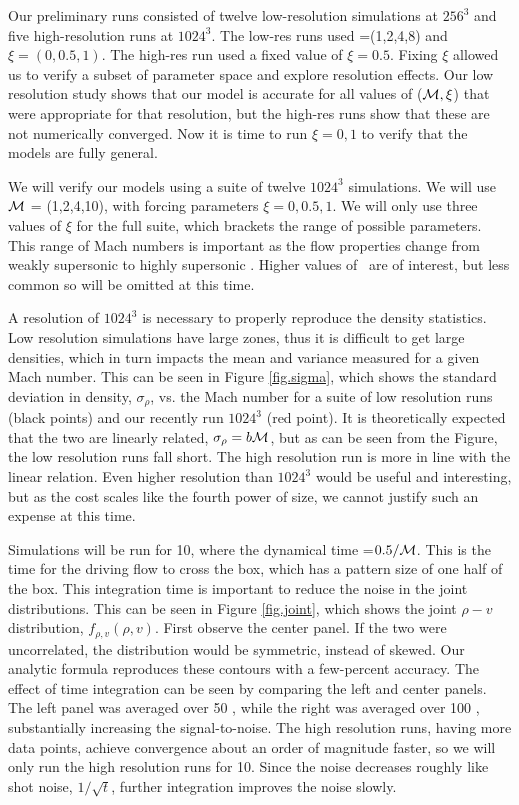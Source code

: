 Our preliminary runs consisted of twelve low-resolution simulations at $256^3$
and five high-resolution runs at $1024^3$.  The low-res runs used
\mach=(1,2,4,8) and $\xi=(0,0.5,1)$.  The high-res run used a fixed value of
$\xi=0.5$.  Fixing $\xi$ allowed us to verify a subset of parameter space and
explore resolution effects.      Our low resolution study shows that our model is
accurate for all values of ($\mathcal{M},\xi$) that were appropriate for that
resolution, but the high-res runs show that these are not numerically converged.
Now it is time to run $\xi=0,1$ to verify that the models are fully
general. 

We will verify our models using a suite of twelve $1024^3$ simulations.  We will use
$\mathcal{M}$ = (1,2,4,10), with forcing parameters $\xi=0,0.5,1$.   We will
only use three values of $\xi$ for the full suite, which brackets the range of
possible parameters.  This range of Mach numbers is important as the flow
properties change from weakly supersonic  to highly supersonic .
Higher values of \mach\ are of interest, but less common so will be omitted at
this time.

A resolution of $1024^3$ is necessary to properly reproduce the density
statistics.  Low resolution simulations have large zones, thus it is difficult
to get large densities, which in turn impacts the mean and variance measured
for a given Mach number.  This can be seen in Figure \ref{fig.sigma}, which
shows the standard deviation in density, $\sigma_\rho$, vs. the Mach number for
a suite of low resolution runs (black points) and our recently run $1024^3$ (red
point).  It
is theoretically expected that the two are linearly related, $\sigma_\rho = b
\mathcal{M}$, but as can be seen from the Figure, the low resolution runs fall short.
The high resolution run is more in line with the linear relation.  Even higher 
resolution than $1024^3$ would be useful and interesting, but as the cost scales like the
fourth power of size, we cannot justify such an expense at this time.

Simulations will be run for 10\tdyn, where the dynamical time \tdyn=$0.5/\mathcal{M}$.
This is the time for the driving flow to cross the box, which has a pattern size
of one half of the box.  This integration time is important to reduce the noise
in the joint distributions.  This can be seen in Figure \ref{fig.joint}, which
shows the joint $\rho-v$ distribution, $f_{\rho,v}(\rho,v)$.  First observe the
center panel.  If the
two were uncorrelated, the distribution would be symmetric, instead of skewed.
Our analytic formula reproduces these contours with a few-percent accuracy.  The effect of time integration
can be seen by comparing the left and center panels.  The left panel was averaged
over 50 \tdyn, while the right was averaged over 100 \tdyn, substantially
increasing the signal-to-noise.  The high resolution runs, having more data
points, achieve convergence about an order of magnitude faster, so we will only
run the high resolution runs for 10\tdyn.  Since the noise decreases roughly
like shot noise, $1/\sqrt{t}$, further integration improves the noise slowly.



